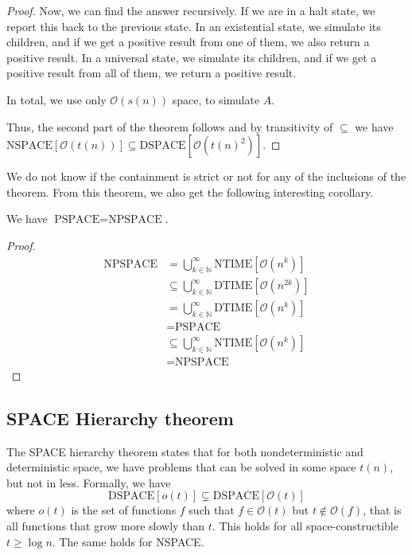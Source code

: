 \begin{proof}
    Now, we can find the answer recursively.
    If we are in a halt state, we report this back to the previous state.
    In an existential state, we simulate its children, and if we get a positive result from one of them, we also return a positive result.
    In a universal state, we simulate its children, and if we get a positive result from all of them, we return a positive result.

    In total, we use only $\mathcal{O}(s(n))$ space, to simulate $A$.

    Thus, the second part of the theorem follows and by transitivity of $\subseteq$ we have $\text{NSPACE}[\mathcal{O}(t(n))] \subseteq \text{DSPACE}[\mathcal{O}(t(n)^2)]$.
\end{proof}

We do not know if the containment is strict or not for any of the inclusions of the theorem.
From this theorem, we also get the following interesting corollary.

\begin{corollary}
    We have $\text{PSPACE} = \text{NPSPACE}$.
\end{corollary}

\begin{proof}
    \begin{align*}
        \text{NPSPACE} &= \bigcup_{k \in \mathbb{N}}^{\infty}\text{NTIME}[\mathcal{O}(n^k)] \\
        &\subseteq \bigcup_{k\in \mathbb{N}}^{\infty}\text{DTIME}[\mathcal{O}(n^{2k})] \\
        &= \bigcup_{k\in \mathbb{N}}^{\infty}\text{DTIME}[\mathcal{O}(n^{k})] \\
        &= \text{PSPACE} \\
        &\subseteq \bigcup_{k\in \mathbb{N}}^{\infty}\text{NTIME}[\mathcal{O}(n^{k})] \\
        &= \text{NPSPACE}
    \end{align*}
\end{proof}

\subsection{SPACE Hierarchy theorem}\label{subsec:space-hierarchy-theorem}

The SPACE hierarchy theorem states that for both nondeterministic and deterministic space, we have problems that can be solved in some space $t(n)$, but not in less.
Formally, we have
\[
    \text{DSPACE}[o(t)] \subsetneq \text{DSPACE}[\mathcal{O}(t)]
\]
where $o(t)$ is the set of functions $f$ such that $f \in \mathcal{O}(t)$ but $t \not \in \mathcal{O}(f)$, that is all functions that grow more slowly than $t$.
This holds for all space-constructible $t \geq \log n$.
The same holds for NSPACE\@.

